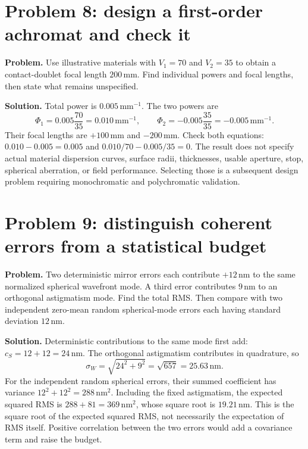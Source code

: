 \section{Problem 8: design a first-order achromat and check it}
\textbf{Problem.} Use illustrative materials with $V_1=70$ and $V_2=35$
to obtain a contact-doublet focal length $200\,\mathrm{mm}$. Find individual
powers and focal lengths, then state what remains unspecified.

\textbf{Solution.} Total power is $0.005\,\mathrm{mm}^{-1}$. The two powers
are
\begin{equation}
 \Phi_1=0.005\frac{70}{35}=0.010\,\mathrm{mm}^{-1},\qquad
 \Phi_2=-0.005\frac{35}{35}=-0.005\,\mathrm{mm}^{-1}.
\end{equation}
Their focal lengths are $+100\,\mathrm{mm}$ and $-200\,\mathrm{mm}$.
Check both equations:
$0.010-0.005=0.005$ and $0.010/70-0.005/35=0$.
The result does not specify actual material dispersion curves, surface
radii, thicknesses, usable aperture, stop, spherical aberration, or field
performance. Selecting those is a subsequent design problem requiring
monochromatic and polychromatic validation.

\section{Problem 9: distinguish coherent errors from a statistical budget}
\textbf{Problem.} Two deterministic mirror errors each contribute
$+12\,\mathrm{nm}$ to the same normalized spherical wavefront mode. A
third error contributes $9\,\mathrm{nm}$ to an orthogonal astigmatism mode.
Find the total RMS. Then compare with two independent zero-mean random
spherical-mode errors each having standard deviation $12\,\mathrm{nm}$.

\textbf{Solution.} Deterministic contributions to the same mode first add:
$c_S=12+12=24\,\mathrm{nm}$. The orthogonal astigmatism contributes in
quadrature, so
\begin{equation}
 \sigma_W=\sqrt{24^2+9^2}=\sqrt{657}=25.63\,\mathrm{nm}.
\end{equation}
For the independent random spherical errors, their summed coefficient has
variance $12^2+12^2=288\,\mathrm{nm}^2$. Including the fixed astigmatism,
the expected squared RMS is $288+81=369\,\mathrm{nm}^2$, whose square root
is $19.21\,\mathrm{nm}$. This is the square root of the expected squared
RMS, not necessarily the expectation of RMS itself. Positive correlation
between the two errors would add a covariance term and raise the budget.

